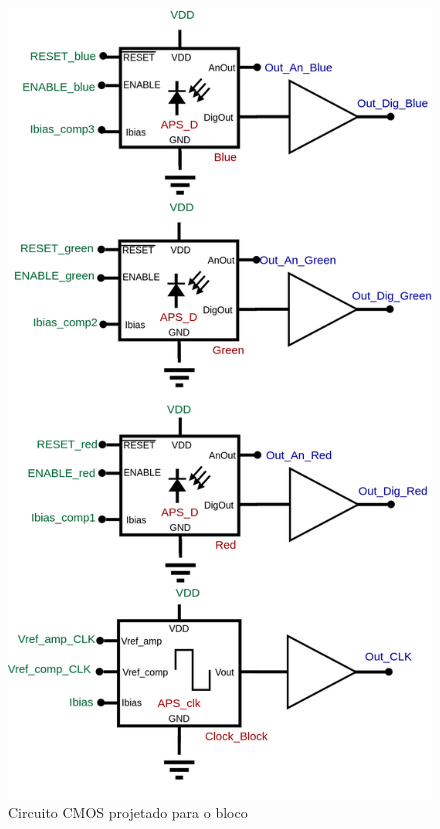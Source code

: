 \begin{figure}[htb]
 \label{\NomePFig}
 \centering
    \centering
    \caption{Circuito CMOS projetado para o bloco \NomeBloco} 
    \includegraphics[scale=0.3]{Circuitos/4APS.png}
\end{figure}

